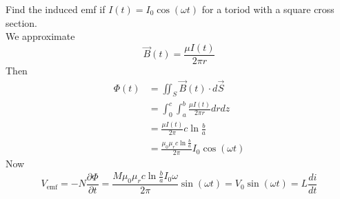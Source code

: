 \documentclass[12pt]{article}
\begin{document}
\begin{ex}
    Find the induced emf if $I(t) = I_0\cos(\omega t)$ for a toriod with a square cross section. \\
    We approximate
    $$\vec B(t) = \frac{\mu I(t)}{2\pi r}$$
    Then
    \begin{align*}
        \Phi(t) &= \iint_S \vec B(t) \cdot d\vec S \\
                &= \int_0^c \int_a^b \frac{\mu I(t)}{2\pi r} drdz \\
                &= \frac{\mu I(t)}{2\pi} c\ln\frac{b}{a} \\
                &= \frac{\mu_0\mu_r c\ln\frac{b}{a}}{2\pi} I_0\cos(\omega t)
    \end{align*}
    Now
    $$V_{\text{emf}} = -N\frac{\partial\Phi}{\partial t} = \frac{M\mu_0\mu_r c\ln\frac{b}{a}I_0\omega}{2\pi}\sin(\omega t) = V_0\sin(\omega t) = L\frac{di}{dt}$$
\end{ex}
\end{document}
